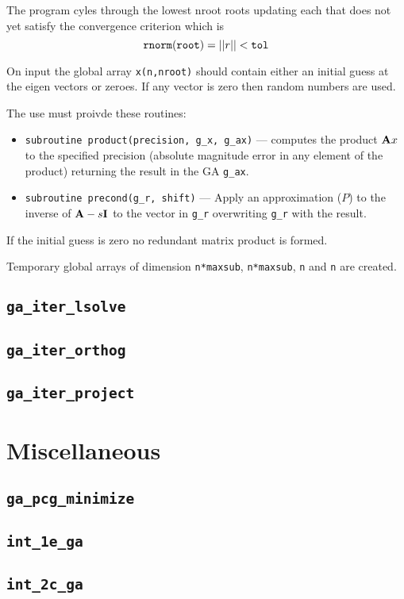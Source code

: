   The program cyles through the lowest nroot roots updating each that
does not yet satisfy the convergence criterion which is
\begin{displaymath}
   {\tt rnorm(root)} = ||r|| < {\tt tol}
\end{displaymath}

 On input the global array \verb+x(n,nroot)+ should contain either an
initial guess at the eigen vectors or zeroes.  If any vector is zero
then random numbers are used.

The use must proivde these routines:
\begin{itemize}
\item \verb+subroutine product(precision, g_x, g_ax)+ ---
     computes the product ${\bf A}x$ to the specified precision (absolute
     magnitude error in any element of the product) returning the result
     in the GA \verb+g_ax+.
\item \verb+subroutine precond(g_r, shift)+ ---
     Apply an approximation ($P$) to the inverse of ${\bf A} - s {\bf
     I}$ to the vector in \verb+g_r+ overwriting \verb+g_r+ with the result.
\end{itemize}
     
If the initial guess is zero no redundant matrix product is formed.
    
Temporary global arrays of dimension \verb+n*maxsub+, \verb+n*maxsub+, 
\verb+n+ and \verb+n+ are created.


\subsection{{\tt ga\_iter\_lsolve}}

\subsection{{\tt ga\_iter\_orthog}}

\subsection{{\tt ga\_iter\_project}}

\section{Miscellaneous}

\subsection{{\tt ga\_pcg\_minimize}}

\subsection{{\tt int\_1e\_ga}}

\subsection{{\tt int\_2c\_ga}}


